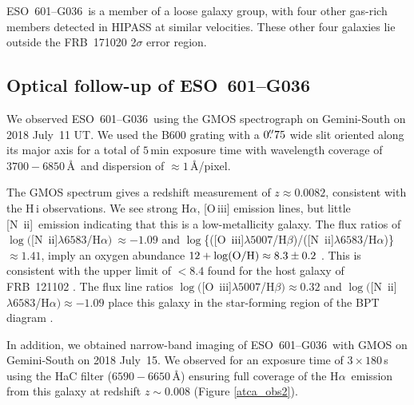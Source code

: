 \documentclass[twocolumn]{aastex63}
\newcommand{\galname}{ESO~601--G036}
\newcommand{\ha}{H$\alpha$}
\newcommand{\hb}{H$\beta$}
\newcommand{\oiii}{[O~{\sc iii}]}
\newcommand{\sii}{[S~{\sc ii}]}
\newcommand{\nii}{[N~{\sc ii}]}
\begin{document}
\galname\ is a member of a loose galaxy group, with four other gas-rich members detected in HIPASS at similar velocities. These other four galaxies lie outside the FRB~171020 2$\sigma$ error region. 

\subsection{Optical follow-up of \galname}

We observed \galname\ using the GMOS spectrograph \citep{Hook2004, Gimeno2016} on Gemini-South on 2018 July~11 UT. We used the B600 grating with a $0\mbox{$.\!\!^{\prime\prime}$}75$ wide slit oriented along its major axis for a total of $5$\,min exposure time with wavelength coverage of $3700-6850$\,\AA\ and dispersion of $\approx 1$\,\AA/pixel. 

The GMOS spectrum gives a redshift measurement of $z \approx 0.0082$, 
consistent with the \mbox{H\,{\sc i}} observations. 
We see strong \ha, [O\,{\sc iii}] emission lines, but little \nii\ emission indicating that this is a low-metallicity galaxy. 
The flux ratios of $\log ($\nii$\lambda6583$/\ha$)~\approx -1.09$ and $\log$\{(\oiii$\lambda5007$/\hb)/(\nii$\lambda6583$/\ha)\}~$\approx 1.41$,
imply an oxygen abundance $12 + \log({\rm O/H}) \approx 8.3 \pm 0.2$  
\citep{PettiniPagel2004}.  
This is consistent with the upper limit of $< 8.4$ found for the 
host galaxy of FRB~121102 \citep{Tendulkar2017}. 
The flux line ratios $\log ($\oiii$\lambda5007$/\hb$)\approx 0.32$
and $\log($\nii$\lambda6583$/\ha$)\approx -1.09$ place this galaxy in the 
star-forming region of the BPT diagram \citep{BPT1981}. 

In addition, we obtained narrow-band imaging of \galname\ with GMOS on Gemini-South on 2018 July~15. We observed for an exposure time of $3\times 180$\,s using the HaC filter ($6590-6650$\,\AA) ensuring full coverage of the \ha\ emission from this galaxy at redshift $z\sim 0.008$
(Figure \ref{atca_obs2}).

\end{document}
